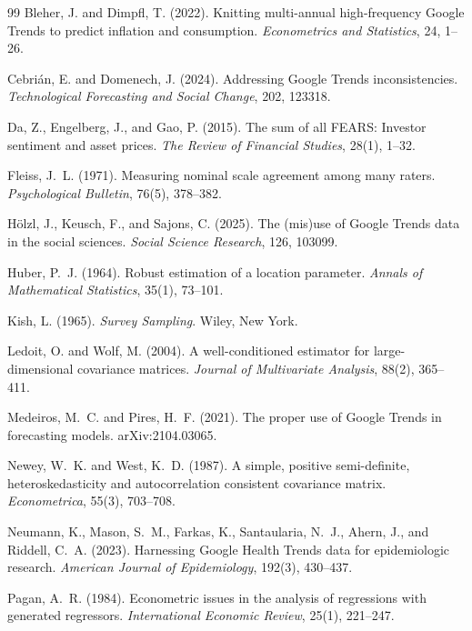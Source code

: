\documentclass[12pt,a4paper,oneside]{article}
\begin{document}
\begin{thebibliography}{99}
Bleher, J. and Dimpfl, T. (2022). Knitting multi-annual high-frequency Google
Trends to predict inflation and consumption. \textit{Econometrics and
Statistics}, 24, 1--26.

Cebri\'{a}n, E. and Domenech, J. (2024). Addressing Google Trends
inconsistencies. \textit{Technological Forecasting and Social Change}, 202,
123318.

Da, Z., Engelberg, J., and Gao, P. (2015). The sum of all FEARS: Investor
sentiment and asset prices. \textit{The Review of Financial Studies}, 28(1),
1--32.

Fleiss, J.~L. (1971). Measuring nominal scale agreement among many raters.
\textit{Psychological Bulletin}, 76(5), 378--382.

H\"{o}lzl, J., Keusch, F., and Sajons, C. (2025). The (mis)use of Google Trends
data in the social sciences. \textit{Social Science Research}, 126, 103099.

Huber, P.~J. (1964). Robust estimation of a location parameter.
\textit{Annals of Mathematical Statistics}, 35(1), 73--101.

Kish, L. (1965). \textit{Survey Sampling}. Wiley, New York.

Ledoit, O. and Wolf, M. (2004). A well-conditioned estimator for
large-dimensional covariance matrices. \textit{Journal of Multivariate
Analysis}, 88(2), 365--411.

Medeiros, M.~C. and Pires, H.~F. (2021). The proper use of Google Trends in
forecasting models. arXiv:2104.03065.

Newey, W.~K. and West, K.~D. (1987). A simple, positive semi-definite,
heteroskedasticity and autocorrelation consistent covariance matrix.
\textit{Econometrica}, 55(3), 703--708.

Neumann, K., Mason, S.~M., Farkas, K., Santaularia, N.~J., Ahern, J., and
Riddell, C.~A. (2023). Harnessing Google Health Trends data for epidemiologic
research. \textit{American Journal of Epidemiology}, 192(3), 430--437.

Pagan, A.~R. (1984). Econometric issues in the analysis of regressions with
generated regressors. \textit{International Economic Review}, 25(1), 221--247.


\end{thebibliography}
\end{document}
